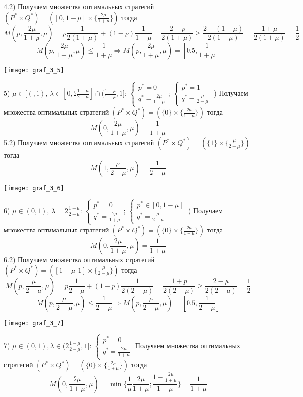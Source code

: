 4.2) Получаем множества оптимальных стратегий 
$(P^{*} \times Q^{*}) =([0,1-\mu] \times \{\frac{2\mu}{1+\mu}\})$ тогда
$$M(p,\frac{2\mu}{1+\mu},\mu)=p\frac{1}{2(1+\mu)}+(1-p)\frac{1}{1+\mu}=\frac{2-p}{2(1+\mu)} \geq
\frac{2 - (1-\mu)}{2(1+\mu)}=\frac{1+\mu}{2(1+\mu)}=\frac{1}{2}$$
$$M(p,\frac{2\mu}{1+\mu},\mu) \leq \frac{1}{1+\mu} \Rightarrow M(p,\frac{2\mu}{1+\mu},\mu) = [0.5, \frac{1}{1+\mu}]$$

\begin{center}
\texttt{[image: graf\_3\_5]}
\end{center}
5) $\mu \in [(, 1)$, $\lambda \in [0, 2\frac{1-\mu}{2-\mu}]\cap(\frac{1-\mu}{1+\mu}, 1]$: 
$\begin{cases}p^{*}=0 \\ q^{*}=\frac{2\mu}{1+\mu} \end{cases}$;
$\begin{cases}p^{*}=1 \\ q^{*}=\frac{\mu}{2-\mu} \end{cases}$
\hfill {}) Получаем множества оптимальных стратегий 
$(P^{*} \times Q^{*}) =(\{0\} \times \{\frac{2\mu}{1+\mu}\})$ тогда
$$M(0, \frac{2\mu}{1+\mu},\mu)=\frac{1}{1+\mu}$$
5.2) Получаем множества оптимальных стратегий 
$(P^{*} \times Q^{*}) =(\{1\}\times \{\frac{\mu}{2-\mu}\})$ тогда
$$M(1, \frac{\mu}{2-\mu},\mu)=\frac{1}{2-\mu}$$

\begin{center}
\texttt{[image: graf\_3\_6]}
\end{center}
6) $\mu \in (0, 1)$, $\lambda = 2\frac{1-\mu}{2-\mu}$: 
$\begin{cases}p^{*}=0 \\ q^{*}=\frac{2\mu}{1+\mu} \end{cases}$;
$\begin{cases}p^{*} \in [0,1-\mu] \\ q^{*}=\frac{\mu}{2-\mu} \end{cases}$
\hfill {}) Получаем множества оптимальных стратегий 
$(P^{*} \times Q^{*}) =(\{0\} \times \{\frac{2\mu}{1+\mu}\})$ тогда
$$M(0, \frac{2\mu}{1+\mu}, \mu)=\frac{1}{1+\mu}$$
6.2) Получаем множествo оптимальных стратегий 
$(P^{*}\times Q^{*}) =([1-\mu,1] \times \{\frac{\mu}{2-\mu}\})$ тогда
$$M(p,\frac{\mu}{2-\mu},\mu)=p\frac{1}{2-\mu}+(1-p)\frac{1}{2(2-\mu)}=\frac{1+p}{2(2-\mu)} \geq \frac{2-\mu}{2(2-\mu)}=\frac{1}{2}$$
$$M(p,\frac{\mu}{2-\mu},\mu) \leq \frac{1}{2-\mu} \Rightarrow M(p,\frac{\mu}{2-\mu},\mu) = [0.5, \frac{1}{2-\mu}]$$


\begin{center}
\texttt{[image: graf\_3\_7]}
\end{center}
7) $\mu \in (0, 1), \lambda \in (2\frac{1-\mu}{2-\mu}, 1]$: 
$\begin{cases}p^{*} =0 \\ q^{*}=\frac{2\mu}{1+\mu} \end{cases}$
\hfill \break
Получаем множества оптимальных стратегий 
$(P^{*} \times Q^{*}) =(\{0\} \times \{\frac{2\mu}{1+\mu}\})$ тогда
$$M(0, \frac{2\mu}{1+\mu}, \mu)=\min \big\{\frac{1}{\mu}\frac{2\mu}{1+\mu}; 
\frac{1-\frac{2\mu}{1+\mu}}{1-\mu}\big\}=\frac{1}{1+\mu}$$

